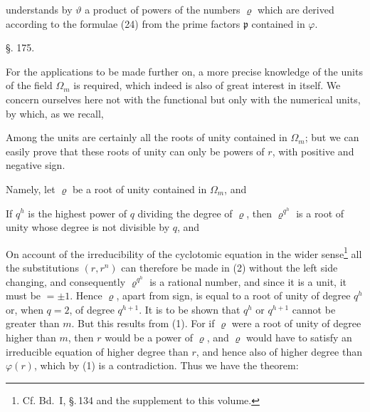 understands by $\vartheta$ a product of powers of the numbers $\varrho$ which
are derived according to the formulae (24) from the prime factors $\mathfrak{p}$
contained in $\varphi$.

\begin{center}
§. 175.

\end{center}

For the applications to be made further on, a more precise
knowledge of the units of the field $\Omega_m$ is required, which indeed
is also of great interest in itself. We concern ourselves
here not with the functional but only with the numerical
units, by which, as we recall, 

Among the units are certainly all the roots of unity contained
in $\Omega_m$; but we can easily prove that these
roots of unity can only be powers of $r$, with positive
and negative sign.

Namely, let $\varrho$ be a root of unity contained in $\Omega_m$, and

If $q^h$ is the highest power of $q$ dividing the degree of $\varrho$,
then $\varrho^{q^h}$ is a root of unity whose degree is not divisible by $q$,
and

On account of the irreducibility of the cyclotomic equation in
the wider sense\footnote{Cf. Bd.~I, §.\,134 and the supplement to this volume.} all the substitutions
 $(r, r^n)$ can therefore be made in (2) without the left side
changing, and consequently $\varrho^{q^h}$ is a rational number, and since it
is a unit, it must be $= \pm 1$. Hence $\varrho$, apart from sign,
is equal to a root of unity of degree $q^h$ or, when $q = 2$,
of degree $q^{h+1}$. It is to be shown that $q^h$ or
$q^{h+1}$ cannot be greater than $m$. But this results
from (1). For if $\varrho$ were a root of unity of degree higher than $m$,
then $r$ would be a power of $\varrho$, and $\varrho$ would have to satisfy an irreducible
 equation of higher degree than $r$, and hence also of higher
degree than $\varphi(r)$, which by (1) is a contradiction. Thus
we have the theorem:
